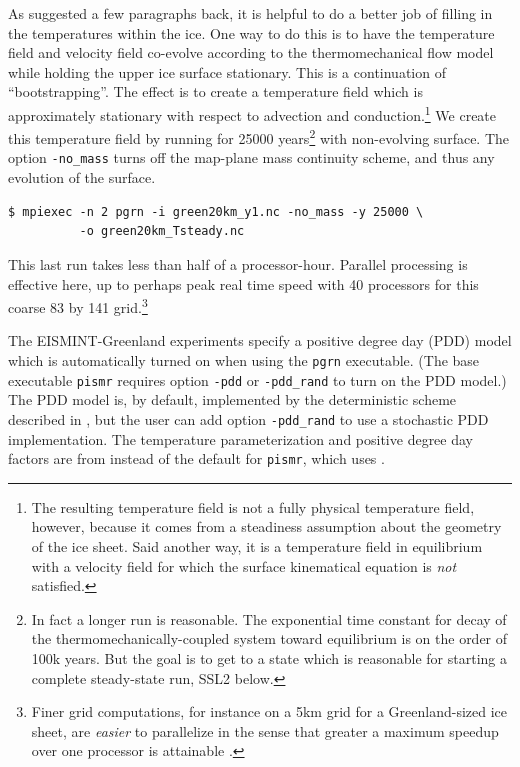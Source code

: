 \documentclass[11pt,final]{amsart}
\begin{document}
As suggested a few paragraphs back, it is helpful to do a better job of filling in the temperatures within the ice.  One way to do this is to have the temperature field and velocity field co-evolve according to the thermomechanical flow model while holding the upper ice surface stationary.  This is a continuation of ``bootstrapping''.  The effect is to create a temperature field which is approximately stationary with respect to advection and conduction.\footnote{The resulting temperature field is not a fully physical temperature field, however, because it comes from a steadiness assumption about the geometry of the ice sheet.  Said another way, it is a temperature field in equilibrium with a velocity field for which the surface kinematical equation \cite{Fowler} is \emph{not} satisfied.}  We create this temperature field by running for 25000 years\footnote{In fact a longer run is reasonable.  The exponential time constant for decay of the thermomechanically-coupled system toward equilibrium is on the order of 100k years.  But the goal is to get to a state which is reasonable for starting a complete steady-state run, SSL2 below.} with non-evolving surface.  The option \verb|-no_mass| turns off the map-plane mass continuity scheme, and thus any evolution of the surface.

\begin{verbatim}
$ mpiexec -n 2 pgrn -i green20km_y1.nc -no_mass -y 25000 \
          -o green20km_Tsteady.nc
\end{verbatim}

This last run takes less than half of a processor-hour.  Parallel processing is effective here, up to perhaps peak real time speed with 40 processors for this coarse 83 by 141 grid.\footnote{Finer grid computations, for instance on a 5km grid for a Greenland-sized ice sheet, are \emph{easier} to parallelize in the sense that greater a maximum speedup over one processor is attainable \cite{BBssasliding}.}

The EISMINT-Greenland experiments \cite{RitzEISMINT} specify a positive degree day (PDD) model which is automatically turned on when using the \verb|pgrn| executable.  (The base executable \verb|pismr| requires option \verb|-pdd| or \verb|-pdd_rand| to turn on the PDD model.)  The PDD model is, by default, implemented by the deterministic scheme described in \cite{CalovGreve05}, but the user can add option \verb|-pdd_rand| to use a stochastic PDD implementation.  The temperature parameterization and positive degree day factors are from \cite{RitzEISMINT} instead of the default for \verb|pismr|, which uses \cite{Faustoetal2009}.
\end{document}
